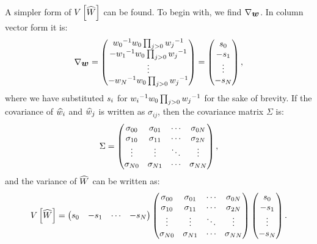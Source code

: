 A simpler form of $V \left[ \widehat{W} \right]$ can be found. To begin with, we find $\nabla_{\mbox{\boldmath $ w_{} $}}$. In column vector form it is:
    \begin{equation}
        \nabla_{\mbox{\boldmath $ w_{} $}} =
        \begin{pmatrix}
            w_{0} {}^{-1}  w_{0} \prod_{j>0} w_{j} {}^{-1}  \\
            -w_{1} {}^{-1} w_{0} \prod_{j>0} w_{j} {}^{-1}   \\
            \vdots \\ 
            -w_{N} {}^{-1}     w_{0} \prod_{j>0} w_{j} {}^{-1}
        \end{pmatrix} =
        \begin{pmatrix}
            s_0   \\ 
            -s_1    \\ 
            \vdots \\ 
            -s_{N}
        \end{pmatrix},
    \end{equation}
where we have substituted $s_i$ for $w_{i} {}^{-1}  w_{0} \prod_{j>0} w_{j} {}^{-1}$ for the sake of brevity. If the covariance of $\widehat{w}_{i}$ and $\widehat{w}_{j}$ is written as $\sigma_{ij}$, then the covariance matrix $\Sigma$ is:
    \begin{equation*}
        \Sigma = 
        \begin{pmatrix}
            \sigma_{00}       & \sigma_{01}       & \cdots & \sigma_{0 N} \\
            \sigma_{10}       & \sigma_{11}       & \cdots & \sigma_{2 N} \\
            \vdots            & \vdots            & \ddots & \vdots            \\
            \sigma_{N 0} & \sigma_{N 1} & \cdots & \sigma_{N N}
        \end{pmatrix},
    \end{equation*}
and the variance of $\widehat{W}$ can be written as:
    \begin{equation}\label{eq:PWest_variance_expansion}
        V \left[ \widehat{W} \right] =
        \begin{pmatrix}
            s_0 & -s_1 & \cdots & -s_{N}
        \end{pmatrix}
        \begin{pmatrix}
            \sigma_{00}       & \sigma_{01}       & \cdots & \sigma_{0 N} \\
            \sigma_{10}       & \sigma_{11}       & \cdots & \sigma_{2 N} \\
            \vdots            & \vdots            & \ddots & \vdots            \\
            \sigma_{N 0} & \sigma_{N 1} & \cdots & \sigma_{N N}
        \end{pmatrix}
        \begin{pmatrix}
            s_0    \\ 
            -s_1    \\
            \vdots \\ 
            -s_{N}
        \end{pmatrix}.
    \end{equation}
